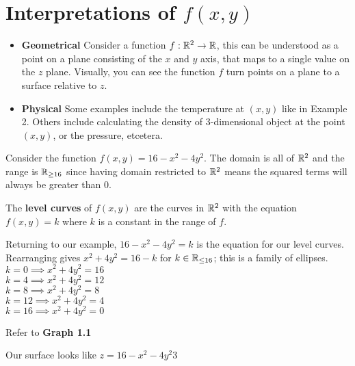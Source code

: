 \documentclass[english, 11pt]{article}
\begin{document}
  \section {Interpretations of $f(x,y)$}

  \begin{itemize}
    \item[]  \textbf {Geometrical}
    Consider a function $f : {\mathbb{R}}^2 \rightarrow {\mathbb{R}}$, this can be understood as a point on a plane consisting of the $x$ and $y$ axis, that maps to a single value on the $z$ plane. Visually, you can see the function $f$ turn points on a plane to a surface relative to $z$.

    \item[] \textbf {Physical}
    Some examples include the temperature at $(x,y)$ like in Example 2. Others include calculating the density of 3-dimensional object at the point $(x,y)$, or the pressure, etcetera.

  \end{itemize}

  \begin{exmp}
    Consider the function $f(x,y) = 16 - x^2 - 4y^2$. The domain is all of ${\mathbb{R}}^2$ and the range is ${\mathbb{R}}_{\geq 16}$ since having domain restricted to ${\mathbb{R}}^2$ means the squared terms will always be greater than 0.
  \end{exmp}

  \begin{defn}\label{level curve}
    The \textbf{level curves} of $f(x,y)$ are the curves in ${\mathbb{R}}^2$ with the equation $f(x,y) = k$ where $k$ is a constant in the range of $f$.
  \end{defn}

  Returning to our example, $16 - x^2 - 4y^2 = k$ is the equation for our level curves. Rearranging gives $x^2 + 4y^2 = 16 - k$ for $k \in {\mathbb{R}}_{\leq 16}$; this is a family of ellipses. \\
  $k = 0 \implies x^2 + 4y^2 = 16$ \\
  $k = 4 \implies x^2 + 4y^2 = 12$ \\
  $k = 8 \implies x^2 + 4y^2 = 8$ \\
  $k = 12 \implies x^2 + 4y^2 = 4$ \\
  $k = 16 \implies x^2 + 4y^2 = 0$
  \begin{center}
    Refer to \textbf{Graph 1.1}
  \end{center}

  Our surface looks like $z = 16 - x^2 - 4y^2$3
\end{document}
